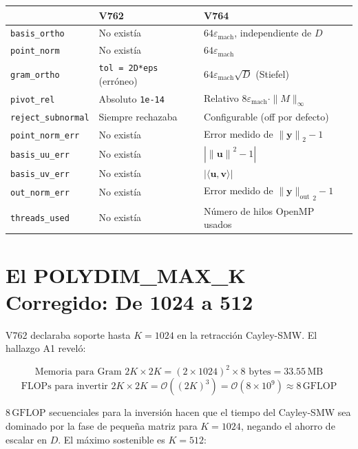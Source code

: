 \begin{tabular}{llll}}
\hline
\textbf{Campo} & \textbf{V762} & \textbf{V764} \\
\hline
\texttt{basis\_ortho} & No existía & $64\varepsilon_{\text{mach}}$, independiente de $D$ \\
\texttt{point\_norm} & No existía & $64\varepsilon_{\text{mach}}$ \\
\texttt{gram\_ortho} & \texttt{tol = 2D*eps} (erróneo) & $64\varepsilon_{\text{mach}}\sqrt{D}$ (Stiefel) \\
\texttt{pivot\_rel} & Absoluto \texttt{1e-14} & Relativo $8\varepsilon_{\text{mach}} \cdot \|{M}\|_\infty$ \\
\texttt{reject\_subnormal} & Siempre rechazaba & Configurable (off por defecto) \\
\hline
\texttt{point\_norm\_err} & No existía & Error medido de $\|{\mathbf{y}\|}_2 - 1$ \\
\texttt{basis\_uu\_err} & No existía & $|\|{\mathbf{u}\|}^2 - 1|$ \\
\texttt{basis\_uv\_err} & No existía & $|\langle\mathbf{u},\mathbf{v}\rangle|$ \\
\texttt{out\_norm\_err} & No existía & Error medido de $\|{\mathbf{y}\|_{\text{out}}}_2 - 1$ \\
\texttt{threads\_used} & No existía & Número de hilos OpenMP usados \\
\hline


\end{tabular}

\section{El POLYDIM\_MAX\_K Corregido: De 1024 a 512}

V762 declaraba soporte hasta $K = 1024$ en la retracción Cayley-SMW. El hallazgo A1 reveló:

\begin{equation}
\text{Memoria para Gram } 2K \times 2K = (2 \times 1024)^2 \times 8 \text{ bytes} = 33.55\,\text{MB}
\end{equation}
\begin{equation}
\text{FLOPs para invertir } 2K \times 2K = \mathcal{O}((2K)^3) = \mathcal{O}(8 \times 10^9) \approx 8\,\text{GFLOP}
\end{equation}

$8\,\text{GFLOP}$ secuenciales para la inversión hacen que el tiempo del Cayley-SMW
sea dominado por la fase de pequeña matriz para $K = 1024$, negando el ahorro de escalar
en $D$. El máximo sostenible es $K = 512$:

